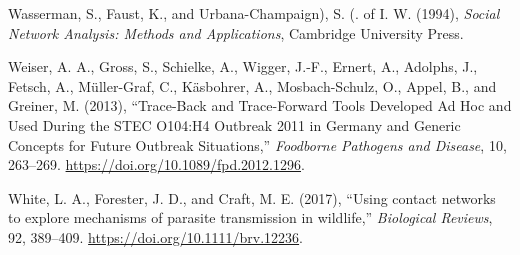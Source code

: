 \documentclass[11pt,a4paper]{article}
\begin{document}
\leavevmode\hypertarget{ref-wasserman_social_1994}{}%
Wasserman, S., Faust, K., and Urbana-Champaign), S. (. of I. W. (1994),
\emph{Social Network Analysis: Methods and Applications}, Cambridge
University Press.

\leavevmode\hypertarget{ref-weiser_trace-back_2013}{}%
Weiser, A. A., Gross, S., Schielke, A., Wigger, J.-F., Ernert, A.,
Adolphs, J., Fetsch, A., Müller-Graf, C., Käsbohrer, A., Mosbach-Schulz,
O., Appel, B., and Greiner, M. (2013), ``Trace-Back and Trace-Forward
Tools Developed Ad Hoc and Used During the STEC O104:H4 Outbreak 2011 in
Germany and Generic Concepts for Future Outbreak Situations,''
\emph{Foodborne Pathogens and Disease}, 10, 263--269.
\url{https://doi.org/10.1089/fpd.2012.1296}.

\leavevmode\hypertarget{ref-white_using_2017}{}%
White, L. A., Forester, J. D., and Craft, M. E. (2017), ``Using contact
networks to explore mechanisms of parasite transmission in wildlife,''
\emph{Biological Reviews}, 92, 389--409.
\url{https://doi.org/10.1111/brv.12236}.
\end{document}
